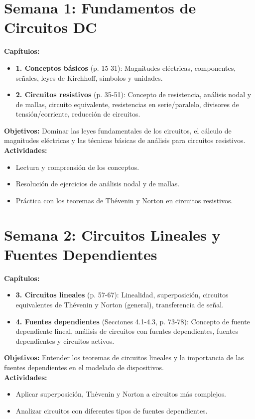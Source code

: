 \documentclass[12pt, a4paper]{article}
\begin{document}
\section{Semana 1: Fundamentos de Circuitos DC}
\textbf{Capítulos:}
\begin{itemize}
    \item \textbf{1. Conceptos básicos} (p. 15-31): Magnitudes eléctricas, componentes, señales, leyes de Kirchhoff, símbolos y unidades.
    \item \textbf{2. Circuitos resistivos} (p. 35-51): Concepto de resistencia, análisis nodal y de mallas, circuito equivalente, resistencias en serie/paralelo, divisores de tensión/corriente, reducción de circuitos.
\end{itemize}
\textbf{Objetivos:} Dominar las leyes fundamentales de los circuitos, el cálculo de magnitudes eléctricas y las técnicas básicas de análisis para circuitos resistivos.\\
\textbf{Actividades:}
\begin{itemize}
    \item Lectura y comprensión de los conceptos.
    \item Resolución de ejercicios de análisis nodal y de mallas.
    \item Práctica con los teoremas de Thévenin y Norton en circuitos resistivos.
\end{itemize}

\section{Semana 2: Circuitos Lineales y Fuentes Dependientes}
\textbf{Capítulos:}
\begin{itemize}
    \item \textbf{3. Circuitos lineales} (p. 57-67): Linealidad, superposición, circuitos equivalentes de Thévenin y Norton (general), transferencia de señal.
    \item \textbf{4. Fuentes dependientes} (Secciones 4.1-4.3, p. 73-78): Concepto de fuente dependiente lineal, análisis de circuitos con fuentes dependientes, fuentes dependientes y circuitos activos.
\end{itemize}
\textbf{Objetivos:} Entender los teoremas de circuitos lineales y la importancia de las fuentes dependientes en el modelado de dispositivos.\\
\textbf{Actividades:}
\begin{itemize}
    \item Aplicar superposición, Thévenin y Norton a circuitos más complejos.
    \item Analizar circuitos con diferentes tipos de fuentes dependientes.
\end{itemize}
\end{document}
